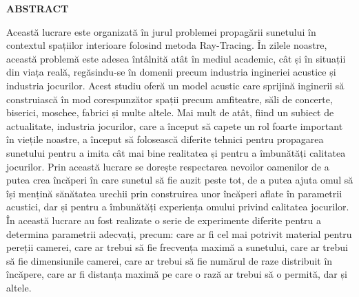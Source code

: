 	\thispagestyle{empty}
	\begin{center}
		\bf{ABSTRACT}
	\end{center}
	
	
	Această lucrare este organizată în jurul problemei propagării sunetului în contextul spațiilor interioare folosind metoda Ray-Tracing. În zilele noastre, această problemă este adesea întâlnită atât în mediul academic, cât
	și în situații din viața reală, regăsindu-se în domenii precum industria ingineriei acustice și industria jocurilor. Acest studiu oferă un model acustic care sprijină inginerii să construiască în mod corespunzător spații precum amfiteatre, săli de concerte, biserici, moschee, fabrici și multe altele. Mai mult de atât, fiind un subiect de actualitate, industria jocurilor, care a început să capete un rol foarte important în viețile noastre, a început să folosească diferite tehnici pentru propagarea sunetului pentru a imita cât mai bine realitatea și pentru a îmbunătăți calitatea jocurilor. Prin această lucrare se dorește respectarea nevoilor oamenilor de a putea crea încăperi în care sunetul să fie auzit peste tot, de a putea ajuta omul să își mențină sănătatea urechii prin construirea unor încăperi aflate în parametrii acustici, dar și pentru a îmbunătăți experiența omului privind calitatea jocurilor. În această lucrare au fost realizate o serie de experimente diferite pentru a determina parametrii adecvați, precum: care ar fi cel mai potrivit material pentru pereții camerei, care ar trebui să fie frecvența maximă a sunetului, care ar trebui să fie dimensiunile camerei, care ar trebui să fie numărul de raze distribuit în încăpere, care ar fi distanța maximă pe care o rază ar trebui să o permită, dar și altele.
